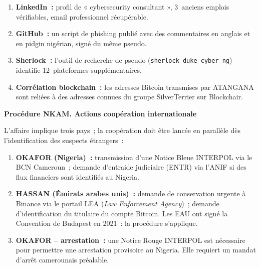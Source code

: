 \begin{enumerate}
    \item \textbf{LinkedIn~:} profil de « cybersecurity consultant »,
          3~anciens emplois vérifiables, email professionnel récupérable.
    \item \textbf{GitHub~:} un script de phishing publié avec des
          commentaires en anglais et en pidgin nigérian, signé du même
          pseudo.
    \item \textbf{Sherlock~:} l'outil de recherche de pseudo
          (\lstinline[language=bash_forensique]{sherlock duke_cyber_ng})
          identifie 12~plateformes supplémentaires.
    \item \textbf{Corrélation blockchain~:} les adresses Bitcoin
          transmises par ATANGANA sont reliées à des adresses connues du
          groupe SilverTerrier sur Blockchair.
\end{enumerate}

\begin{boxPNC}
\textbf{Procédure NKAM. Actions coopération internationale}

L'affaire implique trois pays~; la coopération doit être lancée en parallèle
dès l'identification des suspects étrangers~:

\begin{enumerate}
    \item \textbf{OKAFOR (Nigeria)~:} transmission d'une Notice Bleue
          INTERPOL via le BCN Cameroun~; demande d'entraide judiciaire
          (ENTR) via l'ANIF si des flux financiers sont identifiés au Nigeria.

    \item \textbf{HASSAN (Émirats arabes unis)~:} demande de conservation
          urgente à Binance via le portail LEA (\textit{Law Enforcement
          Agency})~; demande d'identification du titulaire du compte Bitcoin.
          Les EAU ont signé la Convention de Budapest en 2021~: la
          procédure s'applique.

    \item \textbf{OKAFOR -- arrestation~:} une Notice Rouge INTERPOL est
          nécessaire pour permettre une arrestation provisoire au Nigeria.
          Elle requiert un mandat d'arrêt camerounais préalable.
\end{enumerate}
\end{boxPNC}

